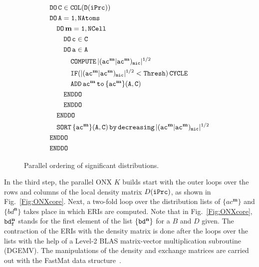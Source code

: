\documentclass[prl,twocolumn,twocolumngrid,superbib]{revtex4} %
\begin{document}
\begin{figure}[htbp]
  \centering
  \caption{\protect
    Parallel ordering of significant distributions. 
  }\label{Fig:List}
  \begin{equation*}
    \begin{split}
      &\tt          DO\,C\in COL(D(iPrc))\\
      &\tt          DO\,A=1,NAtoms\\
      &\tt\quad       DO\,\mathbf{m}=1,NCell\\
      &\tt\qquad        DO\,c\in C\\
      &\tt\qquad        DO\,a\in A\\
      &\tt\qquad\quad     COMPUTE\,|(ac^\mathbf{m}|ac^\mathbf{m})_{mic}|^{1/2}\\
      &\tt\qquad\quad     IF(|(ac^\mathbf{m}|ac^\mathbf{m})_{mic}|^{1/2}<{\tt Thresh)\,CYCLE}\\
      &\tt\qquad\quad     ADD\,ac^\mathbf{m}\,{\tt to}\, \{ac^\mathbf{m}\}(A,C)\\
      &\tt\qquad        ENDDO\\
      &\tt\qquad        ENDDO\\
      &\tt\quad       ENDDO\\
      &\tt\quad       SORT\,\{ac^\mathbf{m}\}(A,C)\,by\,decreasing\,|(ac^\mathbf{m}|ac^\mathbf{m})_{mic}|^{1/2}\\
      &\tt         ENDDO\\
      &\tt         ENDDO
    \end{split}
  \end{equation*}
\end{figure}

In the third step, the parallel ONX $K$ builds start with the outer loops over
the rows and columns of the local density matrix $D({\tt iPrc})$, 
as shown in Fig.~\ref{Fig:ONXcore}. Next, a two-fold loop over
the distribution lists of $\{ac^\mathbf{m}\}$ and $\{bd^\mathbf{n}\}$
takes place in which ERIs are computed. Note that in Fig.~\ref{Fig:ONXcore}, ${\tt bd_f^\mathbf{n}}$ stands
for the first element of the list ${\tt {\tt \{bd^\mathbf{n}}\}}$ for a $B$ and $D$ given. The contraction of 
the ERIs with the density matrix is done after the loops over the lists with the help of a 
Level-2 BLAS matrix-vector multiplication subroutine (DGEMV).
The manipulations of the density and exchange matrices are 
carried out with the {\sc FastMat} data structure~\cite{CGan04B}.
\end{document}
